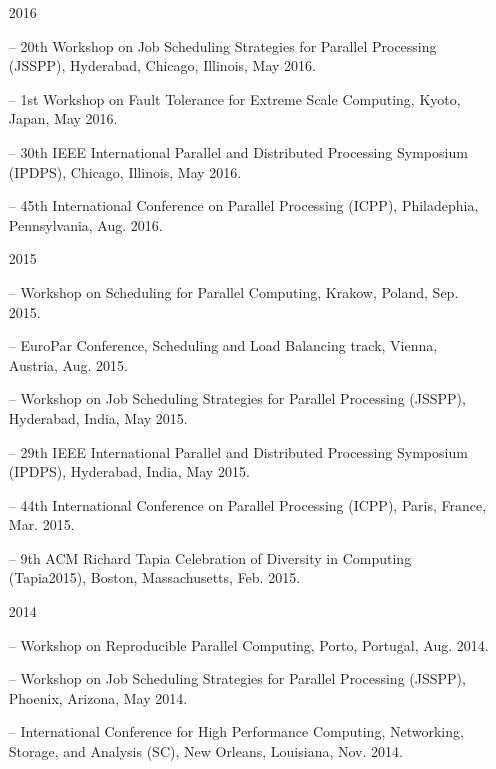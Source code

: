 \documentclass[times,11pt]{letter}
\begin{document}
\begin{itemize}
\item [2016]
\item[--]  20th Workshop on Job Scheduling Strategies for Parallel Processing (JSSPP), Hyderabad, Chicago, Illinois, May 2016.
\item[--]  1st Workshop on Fault Tolerance for Extreme Scale Computing, 
Kyoto, Japan, May 2016.
\item[--]  30th IEEE International Parallel and Distributed Processing Symposium (IPDPS), Chicago, Illinois, May 2016.
\item[--] 45th International Conference on Parallel Processing (ICPP),  Philadephia, Pennsylvania, Aug. 2016.

\item [2015]
\item[--]  Workshop on Scheduling for Parallel Computing, Krakow, Poland, Sep. 2015.
\item[--]  EuroPar Conference, Scheduling and Load Balancing track, Vienna, Austria, Aug. 2015.
\item[--]  Workshop on Job Scheduling Strategies for Parallel Processing (JSSPP), Hyderabad, India, May 2015.
\item[--]  29th IEEE International Parallel and Distributed Processing Symposium (IPDPS), Hyderabad, India, May 2015.
\item[--] 44th International Conference on Parallel Processing (ICPP),  Paris, France, Mar. 2015.
\item[--]  9th ACM Richard Tapia Celebration of Diversity in Computing (Tapia2015), Boston, Massachusetts, Feb. 2015.

\item [2014]
\item[--]  Workshop on Reproducible Parallel Computing, Porto, Portugal,
Aug. 2014.
\item[--]  Workshop on Job Scheduling Strategies for Parallel Processing (JSSPP), Phoenix, Arizona, May 2014.
\item[--]  International Conference for High Performance Computing, Networking, Storage, and Analysis (SC), New Orleans, Louisiana, Nov. 2014.


\end{itemize}
\end{document}
